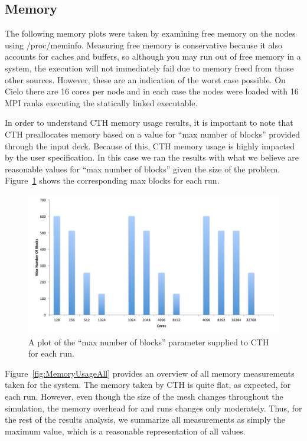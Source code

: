 \subsection{Memory}
The following memory plots were taken by examining free memory on the nodes
using /proc/meminfo.  Measuring free memory is conservative because it also
accounts for caches and buffers, so although you may run out of free memory in
a system, the execution will not immediately fail due to memory freed from
those other sources.  However, these are an indication of the worst case
possible.  On Cielo there are 16 cores per node and in each case the nodes were
 loaded with 16 MPI ranks executing the statically linked executable.

In order to understand CTH memory usage results, it is important to note that
CTH preallocates memory based on a value for ``max number of blocks'' provided
through the input deck.  Because of this, CTH memory usage is highly impacted
by the user specification.  In this case we ran the results with what we
believe are reasonable values for ``max number of blocks'' given the size of the
problem.  Figure~\ref{fig:MaxBlocks} shows the corresponding max blocks for
each run.

\begin{figure}[htb]
  \centering
  \includegraphics[width=\linewidth]{figures/MaxNumberOfBlocks}
  \caption[Max number of blocks parameter.]{A plot of the ``max number of
    blocks'' parameter supplied to CTH for each run.}
  \label{fig:MaxBlocks}
\end{figure}

Figure~\ref{fig:MemoryUsageAll} provides an overview of all memory
measurements taken for the system.  The memory taken by CTH is quite flat,
as expected, for each run.  However, even though the size of the mesh
changes throughout the simulation, the memory overhead for \insitu and
\intransit runs changes only moderately.  Thus, for the rest of the results
analysis, we summarize all measurements as simply the maximum value, which
is a reasonable representation of all values.

